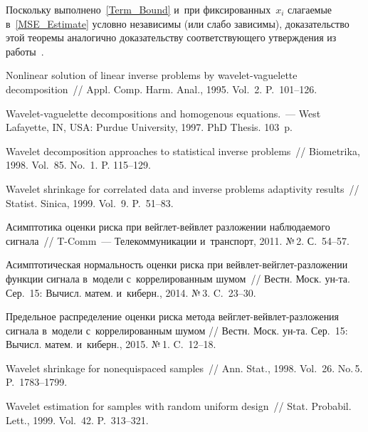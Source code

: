 \begin{multicols}{2}
Поскольку выполнено~\eqref{Term_Bound} и~при фиксированных~$x_i$ слагаемые 
в~\eqref{MSE_Estimate} условно независимы
(или слабо зависимы), доказательство этой теоремы 
аналогично доказательству соответствующего утверж\-де\-ния из работы~\cite{SH16-2}.


{\small\frenchspacing
 {%
 \begin{thebibliography}{99}
Nonlinear solution of linear inverse problems by wavelet-vaguelette decomposition~// 
Appl. Comp. Harm. Anal., 1995. Vol.~2. P.~101--126.

 Wavelet-vaguelette decompositions and homogenous equations.~--- 
West Lafayette, IN, USA: Purdue University, 1997. PhD Thesis. 103~p.

 Wavelet decomposition approaches to 
statistical inverse problems~// Biometrika, 1998. Vol.~85. No.~1. P. 115--129.

Wavelet shrinkage for correlated data and inverse problems adaptivity results~// 
Statist. Sinica, 1999. Vol.~9. P.~51--83.

Асимптотика оценки риска при вейг\-лет-вейв\-лет разложении наблюдаемого сигнала~// T-Comm~--- 
Телекоммуникации и~транспорт, 2011. №\,2. С.~54--57.

Асимптотическая нормальность оценки риска при вейв\-лет-вейг\-лет-раз\-ло\-же\-нии 
функции сигнала в~модели с~коррелированным шумом~// Вестн. Моск. ун-та. Сер.~15: 
Вычисл. матем. и~киберн., 2014. №\,3. C.~23--30.

Предельное распределение оценки риска метода вейг\-лет-вейв\-лет-раз\-ло\-же\-ния 
сигнала в~модели с~коррелированным шумом // Вестн. Моск. ун-та. Сер.~15: Вычисл. матем. и~киберн., 2015. №\,1. C.~12--18.

 Wavelet shrinkage for nonequispaced samples~// 
Ann. Stat., 1998. Vol.~26. No.\,5. P.~1783--1799.

 Wavelet estimation for samples with random uniform 
design~// Stat. Probabil. Lett., 1999. 
Vol.~42. P.~313--321.


\end{thebibliography}}}
\end{multicols}
